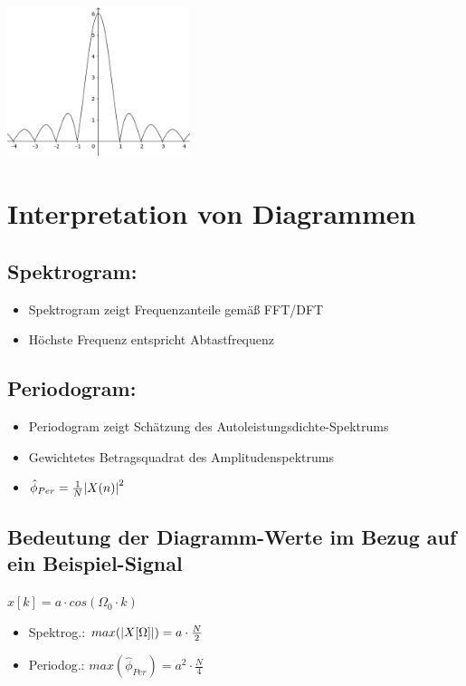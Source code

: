 \documentclass[10pt,a4paper]{article}
\begin{document}
\begin{center}
      \includegraphics[width=0.4\textwidth]{./img/si_funktion.png}
 \end{center}
 \newpageS
\begin{minipage}{0.5\textwidth} 
\section{Interpretation von Diagrammen}
\subsection{Spektrogram:}
\begin{itemize}
    \item Spektrogram zeigt Frequenzanteile gemäß FFT/DFT
    \item Höchste Frequenz entspricht Abtastfrequenz
\end{itemize}

\subsection{Periodogram:}  
\begin{itemize}
    \item Periodogram zeigt Schätzung des Autoleistungsdichte-Spektrums 
    \item Gewichtetes Betragsquadrat des Amplitudenspektrums
    \item $\hat{\phi}_{Per} = \frac{1}{N}\abs{X(n)}^2$
\end{itemize}  

\subsection{Bedeutung der Diagramm-Werte im Bezug auf ein Beispiel-Signal}
$x[k] = a\cdot cos(\Omega_{0}\cdot k)$
\begin{itemize}
    \item Spektrog.: $max(\abs{X[\Omega]})= a\cdot\frac{N}{2}$ 
    \item Periodog.: $max(\hat{\phi}_{Per})= a^{2}\cdot\frac{N}{4}$ 
\end{itemize}
\end{minipage}
\newpage
\end{document}
